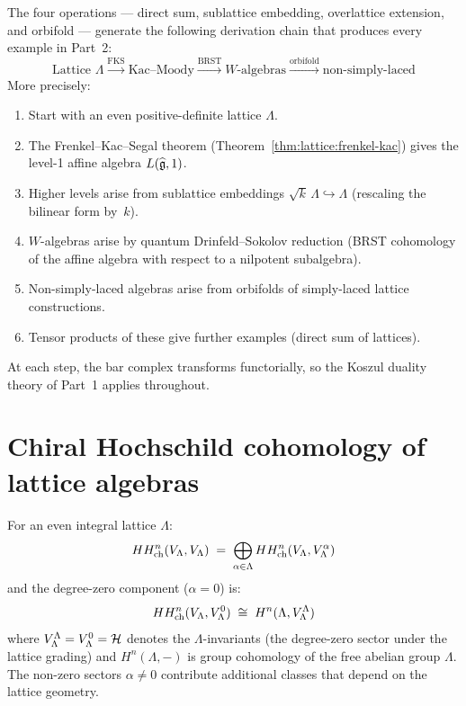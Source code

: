 \begin{remark}\label{rem:lattice:derivation-chain}
The four operations --- direct sum, sublattice embedding, overlattice
extension, and orbifold --- generate the following derivation chain that
produces every example in Part~2:
\[
\text{Lattice } \Lambda
\xrightarrow{\text{FKS}}
\text{Kac--Moody}
\xrightarrow{\text{BRST}}
\text{$W$-algebras}
\xrightarrow{\text{orbifold}}
\text{non-simply-laced}
\]
More precisely:
\begin{enumerate}[label=(\arabic*)]
\item Start with an even positive-definite lattice $\Lambda$.
\item The Frenkel--Kac--Segal theorem (Theorem~\ref{thm:lattice:frenkel-kac})
  gives the level-1 affine algebra $L(\widehat{\mathfrak{g}}, 1)$.
\item Higher levels arise from sublattice embeddings
  $\sqrt{k}\,\Lambda \hookrightarrow \Lambda$ (rescaling the bilinear
  form by~$k$).
\item $W$-algebras arise by quantum Drinfeld--Sokolov reduction (BRST
  cohomology of the affine algebra with respect to a nilpotent
  subalgebra).
\item Non-simply-laced algebras arise from orbifolds of simply-laced
  lattice constructions.
\item Tensor products of these give further examples (direct sum of
  lattices).
\end{enumerate}
At each step, the bar complex transforms functorially, so the Koszul
duality theory of Part~1 applies throughout.
\end{remark}



\section{Chiral Hochschild cohomology of lattice algebras}
\label{sec:lattice:hochschild}

\begin{theorem}\label{thm:lattice:hochschild}
For an even integral lattice $\Lambda$:
\begin{equation}\label{eq:lattice:hochschild}
HH^n_{\mathrm{ch}}(V_\Lambda, V_\Lambda)
\;=\; \bigoplus_{\alpha \in \Lambda}
HH^n_{\mathrm{ch}}(V_\Lambda, V_\Lambda^\alpha)
\end{equation}
and the degree-zero component ($\alpha = 0$) is:
\[
HH^n_{\mathrm{ch}}(V_\Lambda, V_\Lambda^0)
\;\cong\; H^n(\Lambda, V_\Lambda^{\Lambda})
\]
where $V_\Lambda^\Lambda = V_\Lambda^0 = \mathcal{H}$ denotes the
$\Lambda$-invariants (the degree-zero sector under the lattice grading)
and $H^n(\Lambda, -)$ is group cohomology of the free abelian group
$\Lambda$.  The non-zero sectors $\alpha \neq 0$ contribute additional
classes that depend on the lattice geometry.
\end{theorem}

